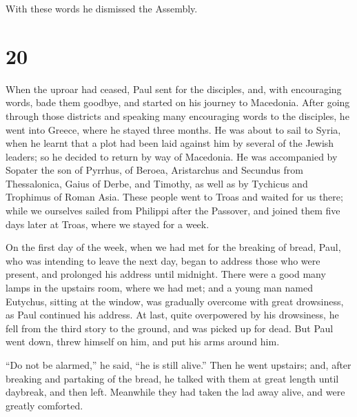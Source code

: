  With these words he dismissed the Assembly.

\hypertarget{section-19}{%
\section{20}\label{section-19}}

 When the uproar had ceased, Paul sent for the disciples,
and, with encouraging words, bade them goodbye, and started on his
journey to Macedonia.  After going through those districts
and speaking many encouraging words to the disciples, he went into
Greece, where he stayed three months.  He was about to sail
to Syria, when he learnt that a plot had been laid against him by
several of the Jewish leaders; so he decided to return by way of
Macedonia.  He was accompanied by Sopater the son of
Pyrrhus, of Beroea, Aristarchus and Secundus from Thessalonica, Gaius of
Derbe, and Timothy, as well as by Tychicus and Trophimus of Roman Asia.
 These people went to Troas and waited for us there;
 while we ourselves sailed from Philippi after the Passover,
and joined them five days later at Troas, where we stayed for a week.

 On the first day of the week, when we had met for the
breaking of bread, Paul, who was intending to leave the next day, began
to address those who were present, and prolonged his address until
midnight.  There were a good many lamps in the upstairs
room, where we had met;  and a young man named Eutychus,
sitting at the window, was gradually overcome with great drowsiness, as
Paul continued his address. At last, quite overpowered by his
drowsiness, he fell from the third story to the ground, and was picked
up for dead.  But Paul went down, threw himself on him, and
put his arms around him.

``Do not be alarmed,'' he said, ``he is still alive.'' 
Then he went upstairs; and, after breaking and partaking of the bread,
he talked with them at great length until daybreak, and then left.
 Meanwhile they had taken the lad away alive, and were
greatly comforted.

